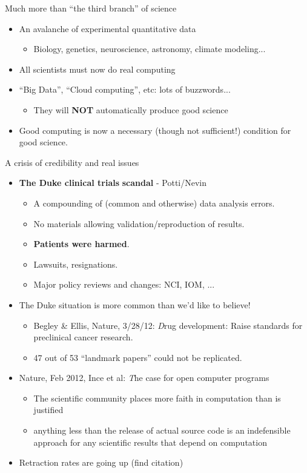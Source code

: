 \documentclass[ChapterTOCs,krantz2]{krantz} %
\begin{document}
Much more than ``the third branch'' of science
\begin{itemize}
\item An avalanche of experimental quantitative data

\begin{itemize}
\item Biology, genetics, neuroscience, astronomy, climate modeling...
\end{itemize}
\item All scientists must now do real computing
\item ``Big Data'', ``Cloud computing'', etc: lots of buzzwords...

\begin{itemize}
\item They will \textbf{NOT} automatically produce good science
\end{itemize}
\item Good computing is now a necessary (though not
sufficient!) condition for good science.
\end{itemize}
A crisis of credibility and real issues
\begin{itemize}
\item <+>\textbf{The Duke clinical trials }\textbf{scandal}\textbf{
}- Potti/Nevin

\begin{itemize}
\item A compounding of (common and otherwise) data analysis errors.
\item No materials allowing validation/reproduction of results.
\item \textbf{Patients were harmed}.
\item Lawsuits, resignations.
\item Major policy reviews and changes: NCI, IOM, ...
\end{itemize}
\item The Duke situation is more common than we'd like
to believe!

\begin{itemize}
\item Begley \& Ellis, Nature, 3/28/12: {\emph Drug development:
Raise standards for preclinical cancer research.}
\item 47 out of 53 ``landmark papers'' could not be replicated.
\end{itemize}
\item Nature, Feb 2012, Ince et al: {\emph The case
for open computer programs}

\begin{itemize}
\item The scientific community places more faith in computation
than is justified
\item anything less than the release of actual source code is an
indefensible approach for any scientific results that depend on computation
\end{itemize}
\item Retraction rates are going up (find citation)
\end{itemize}
\end{document}
